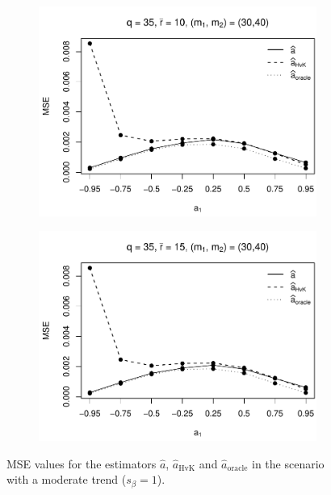 \begin{figure}[h!]
\begin{subfigure}[b]{0.45\textwidth}
\includegraphics[width=\textwidth]{Plots/Robustness/MSE_a1_T=500_slope=1_(q,r,M1,M2)=(35,10,30,40).pdf}
\end{subfigure}
\hspace{0.25cm}
\begin{subfigure}[b]{0.45\textwidth}
\includegraphics[width=\textwidth]{Plots/Robustness/MSE_a1_T=500_slope=1_(q,r,M1,M2)=(35,15,30,40).pdf}
\end{subfigure}
\caption{MSE values for the estimators $\widehat{a}$, $\widehat{a}_{\text{HvK}}$ and $\widehat{a}_{\text{oracle}}$ in the scenario with a moderate trend ($s_\beta=1$).}\label{fig:MSE_slope1_AR_robust} 
\end{figure}


